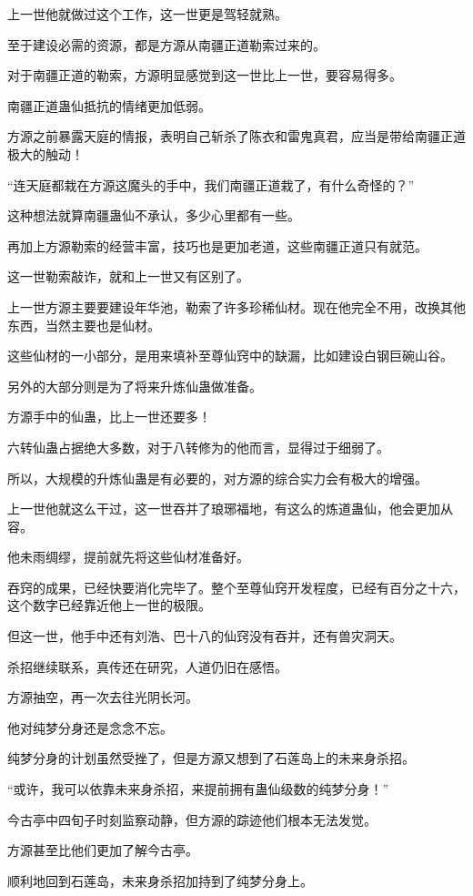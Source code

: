 \begin{this_body}
上一世他就做过这个工作，这一世更是驾轻就熟。

至于建设必需的资源，都是方源从南疆正道勒索过来的。

对于南疆正道的勒索，方源明显感觉到这一世比上一世，要容易得多。

南疆正道蛊仙抵抗的情绪更加低弱。

方源之前暴露天庭的情报，表明自己斩杀了陈衣和雷鬼真君，应当是带给南疆正道极大的触动！

“连天庭都栽在方源这魔头的手中，我们南疆正道栽了，有什么奇怪的？”

这种想法就算南疆蛊仙不承认，多少心里都有一些。

再加上方源勒索的经营丰富，技巧也是更加老道，这些南疆正道只有就范。

这一世勒索敲诈，就和上一世又有区别了。

上一世方源主要要建设年华池，勒索了许多珍稀仙材。现在他完全不用，改换其他东西，当然主要也是仙材。

这些仙材的一小部分，是用来填补至尊仙窍中的缺漏，比如建设白钢巨碗山谷。

另外的大部分则是为了将来升炼仙蛊做准备。

方源手中的仙蛊，比上一世还要多！

六转仙蛊占据绝大多数，对于八转修为的他而言，显得过于细弱了。

所以，大规模的升炼仙蛊是有必要的，对方源的综合实力会有极大的增强。

上一世他就这么干过，这一世吞并了琅琊福地，有这么的炼道蛊仙，他会更加从容。

他未雨绸缪，提前就先将这些仙材准备好。

吞窍的成果，已经快要消化完毕了。整个至尊仙窍开发程度，已经有百分之十六，这个数字已经靠近他上一世的极限。

但这一世，他手中还有刘浩、巴十八的仙窍没有吞并，还有兽灾洞天。

杀招继续联系，真传还在研究，人道仍旧在感悟。

方源抽空，再一次去往光阴长河。

他对纯梦分身还是念念不忘。

纯梦分身的计划虽然受挫了，但是方源又想到了石莲岛上的未来身杀招。

“或许，我可以依靠未来身杀招，来提前拥有蛊仙级数的纯梦分身！”

今古亭中四旬子时刻监察动静，但方源的踪迹他们根本无法发觉。

方源甚至比他们更加了解今古亭。

顺利地回到石莲岛，未来身杀招加持到了纯梦分身上。


\end{this_body}
